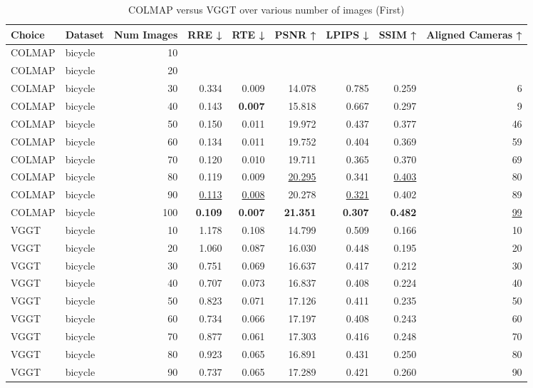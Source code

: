 \begin{table}[H]
\caption{\ifdefined\customcaption \customcaption \else COLMAP versus VGGT over various number of images (First) \fi}
\label{tab:01_num_images_first}
\centering
\scriptsize
\begin{tabular}{llrrrrrrr}
\toprule
Choice & Dataset & Num Images & RRE ↓ & RTE ↓ & PSNR ↑ & LPIPS ↓ & SSIM ↑ & Aligned Cameras ↑ \\
\midrule
COLMAP & bicycle & 10 &  &  &  &  &  &  \\
COLMAP & bicycle & 20 &  &  &  &  &  &  \\
COLMAP & bicycle & 30 & 0.334 & 0.009 & 14.078 & 0.785 & 0.259 & 6 \\
COLMAP & bicycle & 40 & 0.143 & \textbf{0.007} & 15.818 & 0.667 & 0.297 & 9 \\
COLMAP & bicycle & 50 & 0.150 & 0.011 & 19.972 & 0.437 & 0.377 & 46 \\
COLMAP & bicycle & 60 & 0.134 & 0.011 & 19.752 & 0.404 & 0.369 & 59 \\
COLMAP & bicycle & 70 & 0.120 & 0.010 & 19.711 & 0.365 & 0.370 & 69 \\
COLMAP & bicycle & 80 & 0.119 & 0.009 & \underline{20.295} & 0.341 & \underline{0.403} & 80 \\
COLMAP & bicycle & 90 & \underline{0.113} & \underline{0.008} & 20.278 & \underline{0.321} & 0.402 & 89 \\
COLMAP & bicycle & 100 & \textbf{0.109} & \textbf{0.007} & \textbf{21.351} & \textbf{0.307} & \textbf{0.482} & \underline{99} \\
VGGT & bicycle & 10 & 1.178 & 0.108 & 14.799 & 0.509 & 0.166 & 10 \\
VGGT & bicycle & 20 & 1.060 & 0.087 & 16.030 & 0.448 & 0.195 & 20 \\
VGGT & bicycle & 30 & 0.751 & 0.069 & 16.637 & 0.417 & 0.212 & 30 \\
VGGT & bicycle & 40 & 0.707 & 0.073 & 16.837 & 0.408 & 0.224 & 40 \\
VGGT & bicycle & 50 & 0.823 & 0.071 & 17.126 & 0.411 & 0.235 & 50 \\
VGGT & bicycle & 60 & 0.734 & 0.066 & 17.197 & 0.408 & 0.243 & 60 \\
VGGT & bicycle & 70 & 0.877 & 0.061 & 17.303 & 0.416 & 0.248 & 70 \\
VGGT & bicycle & 80 & 0.923 & 0.065 & 16.891 & 0.431 & 0.250 & 80 \\
VGGT & bicycle & 90 & 0.737 & 0.065 & 17.289 & 0.421 & 0.260 & 90 \\

\end{tabular}
\end{table}

